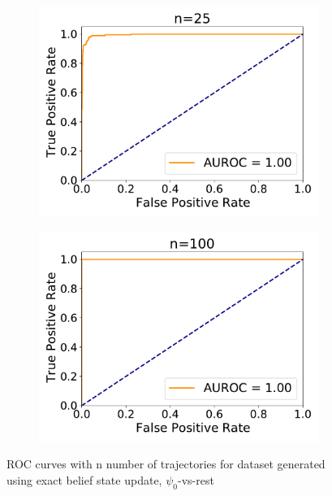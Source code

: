\begin{figure}[H]
\begin{subfigure}{.33\textwidth}
		\includegraphics[width=1\linewidth]{figures/roc_analysis/roc_exactUpdate/AUROC_2000samples_class0_llh_n25}
		\caption{}
		\label{fig:roc_exact_n25}
	\end{subfigure}
	\begin{subfigure}{.33\textwidth}
		\centering
		\includegraphics[width=1\linewidth]{figures/roc_analysis/roc_exactUpdate/AUROC_2000samples_class0_llh_n100}
		\caption{}
		\label{fig:roc_exact_n100}
	\end{subfigure}
	\caption{ROC curves with n number of trajectories for dataset generated using exact belief state update, $ \psi_0 $-vs-rest}
	\label{fig:roc_exact}
\end{figure}

